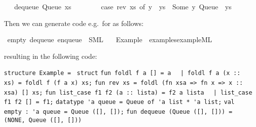 \begin{isabellebody}
\ \ {\isacharbar}\ {\isachardoublequoteopen}dequeue\ {\isacharparenleft}Queue\ xs\ {\isacharbrackleft}{\isacharbrackright}{\isacharparenright}\ {\isacharequal}\isanewline
\ \ \ \ \ \ {\isacharparenleft}case\ rev\ xs\ of\ y\ {\isacharhash}\ ys\ {\isasymRightarrow}\ {\isacharparenleft}Some\ y{\isacharcomma}\ Queue\ {\isacharbrackleft}{\isacharbrackright}\ ys{\isacharparenright}{\isacharparenright}{\isachardoublequoteclose}%
\endisatagquote
{\isafoldquote}%
%
\isadelimquote
%
\endisadelimquote
%
\begin{isamarkuptext}%
\noindent Then we can generate code e.g.~for  as follows:%
\end{isamarkuptext}%
\isamarkuptrue%
%
\isadelimquote
%
\endisadelimquote
%
\isatagquote
{}\isamarkupfalse%
\ empty\ dequeue\ enqueue\ \ SML\isanewline
\ \ \ Example\ \ {\isachardoublequoteopen}examples{\isacharslash}example{\isachardot}ML{\isachardoublequoteclose}%
\endisatagquote
{\isafoldquote}%
%
\isadelimquote
%
\endisadelimquote
%
\begin{isamarkuptext}%
\noindent resulting in the following code:%
\end{isamarkuptext}%
\isamarkuptrue%
%
\isadelimquote
%
\endisadelimquote
%
\isatagquote
%
\begin{isamarkuptext}%
\isaverbatim%
\noindent%
\verb|structure Example = |\newline%
\verb|struct|\newline%
\newline%
\verb|fun foldl f a [] = a|\newline%
\verb|  |\verb,|,\verb| foldl f a (x :: xs) = foldl f (f a x) xs;|\newline%
\newline%
\verb|fun rev xs = foldl (fn xsa => fn x => x :: xsa) [] xs;|\newline%
\newline%
\verb|fun list_case f1 f2 (a :: lista) = f2 a lista|\newline%
\verb|  |\verb,|,\verb| list_case f1 f2 [] = f1;|\newline%
\newline%
\verb|datatype 'a queue = Queue of 'a list * 'a list;|\newline%
\newline%
\verb|val empty : 'a queue = Queue ([], []);|\newline%
\newline%
\verb|fun dequeue (Queue ([], [])) = (NONE, Queue ([], []))|\newline%

\end{isamarkuptext}
\end{isabellebody}
